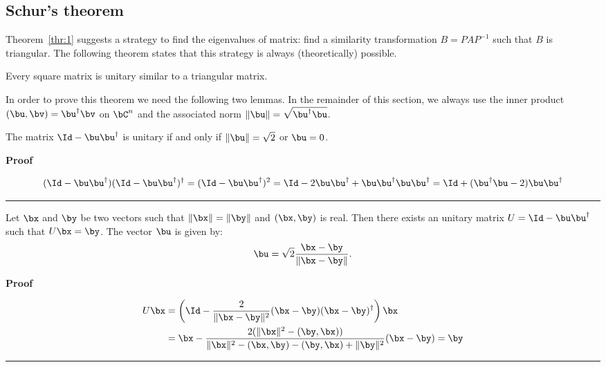 \subsection{Schur's theorem}

Theorem~\ref{thr:1} suggests a strategy to find the eigenvalues of
matrix: find a similarity transformation $B = P A P^{-1}$ such that
$B$ is triangular.  The following theorem states that this strategy is
always (theoretically) possible.

\begin{theorem}[Schur]
  Every square matrix is unitary similar to a triangular matrix.
\end{theorem}

\noindent
In order to prove this theorem we need the following two lemmas. In
the remainder of this section, we always use the inner product
$(\bu,\bv)=\bu^\dagger\bv$ on $\bC^n$ and the associated norm
$\|\bu\|=\sqrt{\bu^\dagger\bu}$.

\begin{lemma}
  \label{ax:1}
  The matrix $\Id - \bu \bu^{\dagger}$ is unitary if and only if
  $\|\bu\| = \sqrt{2}$ or $\bu=0$.
\end{lemma}
\noindent 
\textbf{Proof}

\begin{equation*}
  (\Id - \bu \bu^{\dagger})(\Id - \bu \bu^{\dagger})^\dagger
  = (\Id - \bu \bu^{\dagger})^2 = \Id - 2 \bu \bu^{\dagger}
  + \bu \bu^{\dagger} \bu \bu^{\dagger}
  = \Id +(\bu^{\dagger} \bu - 2) \bu \bu^{\dagger}
\end{equation*}
\null \hfill \rule{3mm}{3mm}

\begin{lemma}
  \label{ax:2}
  Let $\bx$ and $\by$ be two vectors such that $\|\bx\| = \|\by\|$ and
  $(\bx,\by)$ is real.  Then there exists an unitary matrix $U = \Id -
  \bu \bu^{\dagger}$ such that $U \bx = \by$.  The vector $\bu$ is
  given by:
  \begin{equation*}
    \bu = \sqrt{2} \frac{\bx - \by}{\|\bx - \by\|} .
  \end{equation*}
\end{lemma}
\noindent 
\textbf{Proof}

\begin{align*}
  U \bx &= \left(\Id - \frac{2}{\|\bx - \by\|^2}(\bx - \by)(\bx - \by)^\dagger
  \right) \bx \\
  &= \bx - \frac{2 (\|\bx\|^2 - (\by,\bx))}{
    \|\bx\|^2 - (\bx,\by) - (\by,\bx) + \|\by\|^2} (\bx - \by) = \by
\end{align*}
\null \hfill \rule{3mm}{3mm}

